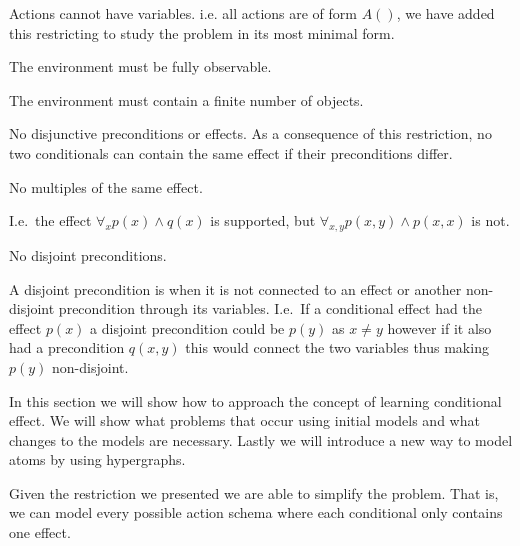 \documentclass[\master/Master.tex]{subfiles}
\begin{document}
\begin{arestriction}\leavevmode
\begin{propenum}[label=R.\arabic*]
	\item Actions cannot have variables. i.e. all actions are of form $A()$, 
	we have added this restricting to study the problem in its most minimal form.	
		
	\item The environment must be fully observable.
	\item The environment must contain a finite number of objects.
	\item \label{rst:ca:no-disjuntive-conditionals} No disjunctive preconditions or effects. As a consequence of this restriction, no two conditionals can contain the same effect if their preconditions differ.
	\item \label{rst:ca:no-multiple-effect} No multiples of the same effect.

		  I.e.\ the effect $\forall_x p(x) \land q(x)$ is supported, but $\forall_{x, y} p(x, y) \land p(x, x) $ is not.

	\item \label{rst:ca:no-disjoint-preconditions} No disjoint preconditions.

		  A disjoint precondition is when it is not connected to an effect or another non-disjoint precondition through its variables.
		  I.e.\ If a conditional effect had the effect $p(x)$ a disjoint precondition could be $p(y)$ as $x \neq y$ however if it also had a precondition $q(x,y)$ this would connect the two variables thus making $p(y)$ non-disjoint.
\end{propenum}
\end{arestriction}
%

In this section we will show how to approach the concept of learning conditional effect. We will show what problems that occur using initial models and what changes to the models are necessary. Lastly we will introduce a new way to model atoms by using hypergraphs.


Given the restriction we presented we are able to simplify the problem. That is, we can model every possible action schema where each conditional only contains one effect.
\end{document}
